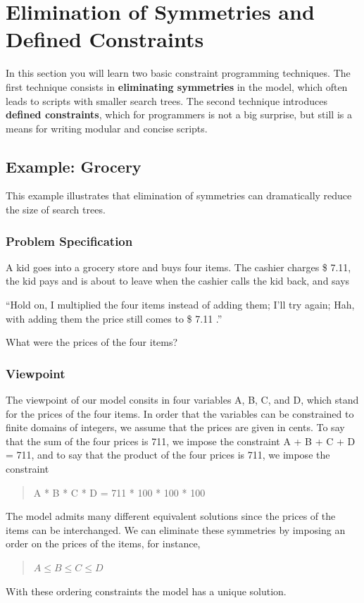 \documentclass[a4paper,halfparskip]{scrartcl}
\begin{document}
\newpage
\section{Elimination of Symmetries and Defined Constraints}
In this section you will learn two basic constraint programming techniques. 
The first technique consists in \textbf{eliminating symmetries} in the model, 
which often leads to scripts with smaller search trees. The second technique 
introduces \textbf{defined constraints}, which for programmers is not a big
surprise, but still is a means for writing modular and concise scripts.

\subsection{Example: Grocery}
This example illustrates that elimination of symmetries can 
dramatically reduce 
the size of search trees.

\subsubsection{Problem Specification}
A kid goes into a grocery store and buys four items. 
The cashier charges \$ 7.11, the kid 
pays and is about to leave when the cashier calls the kid back, 
and says

``Hold on, I multiplied the four items instead of adding them; 
I'll try again; 
Hah, with adding them the price still comes to \$ 7.11 .''

What were the prices of the four items?

\subsubsection{Viewpoint}
The viewpoint of our model consits in four variables 
A, B, C, and D, which stand for the 
prices of the four items. In order that the variables
 can be constrained 
to finite domains of integers, we assume that the prices 
are given in cents. 
To say that the sum of the four prices is 711, 
we impose the constraint A + B + C + D = 711, and to say 
that the product 
of the four prices is 711, we impose the constraint
\begin{quote}
A * B * C * D = 711 * 100 * 100 * 100
\end{quote}
The model admits many different equivalent solutions since the 
prices of 
the items can be interchanged. We can eliminate these 
symmetries by imposing an order 
on the prices of the items, for instance,
\begin{quote} 
$ A \le B \le C \le D$
\end{quote}
With these ordering constraints the model has a unique solution.
\end{document}
